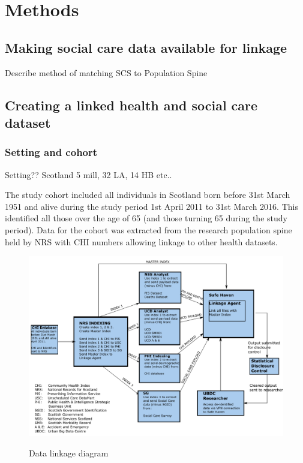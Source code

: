 \documentclass[]{article}
\title{}
\author{}
\date{}
\begin{document}
\chapter{Methods}\label{ch:methods}

\section{Making social care data available for linkage}\label{sec:linkage}

Describe method of matching SCS to Population Spine

\section{Creating a linked health and social care dataset}\label{sec:make-dataset}

\FloatBarrier

\subsection{Setting and cohort}\label{subsec:setting-cohort}

Setting?? Scotland 5 mill, 32 LA, 14 HB etc..

The study cohort included all individuals in Scotland born before 31st
March 1951 and alive during the study period 1st April 2011 to 31st
March 2016. This identified all those over the age of 65 (and those
turning 65 during the study period). Data for the cohort was extracted
from the research population spine held by NRS with CHI numbers allowing
linkage to other health datasets.

\begin{landscape}
\begin{figure}
  \centering
    \caption{Data linkage diagram}
    \includegraphics{data/produced_data/linkage-diagram/linkage-diagram.pdf}
    \label{fig:methods-linkage}
\end{figure}
\end{landscape}
\end{document}
